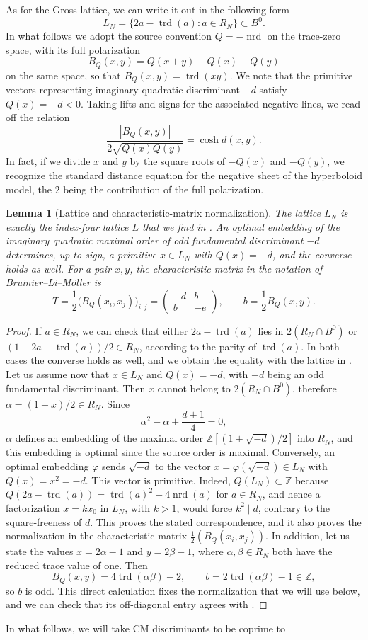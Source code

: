 \documentclass[11pt,reqno]{amsart}
\newtheorem{lemma}[theorem]{Lemma}
\theoremstyle{definition}
\newcommand{\Z}{\mathbb Z}
\newcommand{\trd}{\operatorname{trd}}
\newcommand{\nrd}{\operatorname{nrd}}
\begin{document}
As for the Gross lattice, we can write it out in the following form
\[
 L_N=\{2a-\trd(a):a\in R_N\}\subset B^0.
\] In what follows we adopt the source convention $Q=-\nrd$ on the
trace-zero space, with its full polarization \[ B_Q(x,y)=Q(x+y)-Q(x)-Q(y) \]
on the same space, so that $B_Q(x,y)=\trd(xy)$.
We note that the primitive vectors representing imaginary quadratic
discriminant $-d$ satisfy $Q(x)=-d<0$. 
Taking lifts and signs for the associated negative lines, we read off the
relation \[ \frac{|B_Q(x,y)|}{2\sqrt{Q(x)Q(y)}}=\cosh d(x,y).
\] In fact, if we divide $x$ and $y$ by the square roots of $-Q(x)$ and
$-Q(y)$, we recognize the standard distance equation for the negative sheet
of the hyperboloid model, the $2$ being the contribution of the full
polarization.

\begin{lemma}[Lattice and characteristic-matrix normalization]
\label{lem:normalization} The lattice $L_N$ is exactly the index-four
lattice $L$ that we find in \cite[Equation (2.9)]{BruinierLiMoller}. An optimal embedding of the imaginary quadratic
maximal order of odd fundamental discriminant $-d$ determines, up to sign, a
primitive $x\in L_N$ with $Q(x)=-d$, and the converse holds as well. For a
pair $x,y$, the characteristic matrix in the notation of
Bruinier--Li--M\"oller is
\[
 T=\frac12\bigl(B_Q(x_i,x_j)\bigr)_{i,j}
  =\begin{pmatrix}-d&b\\ b&-e\end{pmatrix},
 \qquad b=\frac12B_Q(x,y).
\] \end{lemma} \begin{proof} If $a\in R_N$, we can check that either
$2a-\trd(a)$ lies in $2(R_N\cap B^0)$ or $(1+2a-\trd(a))/2\in R_N$, 
according to the parity of $\trd(a)$. In both cases the converse holds as well, and we obtain the equality with
the lattice in \cite[Equation (2.9)]{BruinierLiMoller}. Let us assume now that $x\in L_N$ and $Q(x)=-d$, with $-d$ being an odd
fundamental discriminant. Then $x$ cannot belong to $2(R_N\cap B^0)$, therefore $\alpha=(1+x)/2\in R_N$. Since \[ \alpha^2-\alpha+\frac{d+1}{4}=0, \] $\alpha$ defines an
embedding of the maximal order $\Z[(1+\sqrt{-d})/2]$ into $R_N$, and this
embedding is optimal since the source order is maximal.
Conversely, an optimal embedding $\varphi$ sends $\sqrt{-d}$ to the
vector $x=\varphi(\sqrt{-d})\in L_N$ with $Q(x)=x^2=-d$. This vector is primitive.
Indeed, $Q(L_N)\subset\Z$ because $Q(2a-\trd(a))=\trd(a)^2-4\nrd(a)$ for
$a\in R_N$, and hence a factorization $x=kx_0$ in $L_N$, with $k>1$, would
force $k^2\mid d$, contrary to the square-freeness of $d$. This proves the
stated correspondence, and it also proves the normalization in the
characteristic matrix $\frac12(B_Q(x_i,x_j))$. In addition, let us state the values $x=2\alpha-1$ and $y=2\beta-1$, where
$\alpha,\beta\in R_N$ both have the reduced trace value of one.
Then
\[
 B_Q(x,y)=4\trd(\alpha\beta)-2,
 \qquad b=2\trd(\alpha\beta)-1\in\Z,
\]
so $b$ is odd. This direct calculation fixes the normalization that we will use below, and
we can check that its off-diagonal entry agrees with \cite[Equation
(2.14)]{BruinierLiMoller}.
\end{proof} In what follows, we will take CM discriminants to be coprime to
\end{document}
